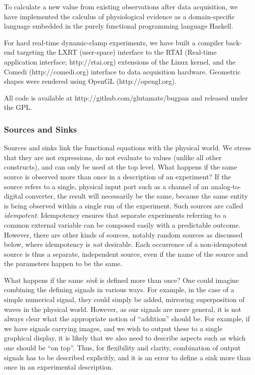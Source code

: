To calculate a new value from existing observations after data
acquisition, we have implemented the calculus of physiological
evidence as a domain-specific language embedded in the purely functional
programming language Haskell. 

For hard real-time dynamic-clamp experiments, we have built a compiler
back-end targeting the LXRT (user-space) interface to the RTAI (Real-time
application interface; http://rtai.org) extensions of the Linux
kernel, and the Comedi (http://comedi.org) interface to data
acquisition hardware. Geometric shapes were rendered using OpenGL
(http://opengl.org).

All code is available at http://github.com/glutamate/bugpan and
released under the GPL.

\subsubsection*{Sources and Sinks}

Sources and sinks 
%
%
link the functional equations with the physical world. We stress that they are
not expressions, do not evaluate to values (unlike all other
constructs), and can only be used at the top level. What happens if the
same source is observed more than once in a description of an
experiment?  If the source refers to a single, physical input port
such as a channel of an analog-to-digital converter, the result will
necessarily be the same, because the same entity is being observed
within a single run of the experiment. Such sources are called
\emph{idempotent}.  Idempotency ensures that separate experiments
referring to a common external variable can be composed easily with a
predictable outcome. However, there are other kinds of sources,
notably random sources as discussed below, where idempotency is
\emph{not} desirable. Each occurrence of a non-idempotent source is
thus a separate, independent source, even if the name of the source
and the parameters happen to be the same.

What happens if the same \emph{sink} is defined more than once? One could
imagine combining the defining signals in various ways. For example, in the
case of a simple numerical signal, they could simply be added, mirroring
superposition of waves in the physical world. However, as our signals are more
general, it is not always clear what the appropriate notion of ``addition''
should be. For example, if we have signals carrying images, and we wish to
output these to a single graphical display, it is likely that we also need to
describe aspects such as which one should be ``on top''. Thus, for flexibility
and clarity, combination of output signals has to be described explicitly, and
it is an error to define a sink more than once in an experimental description.

